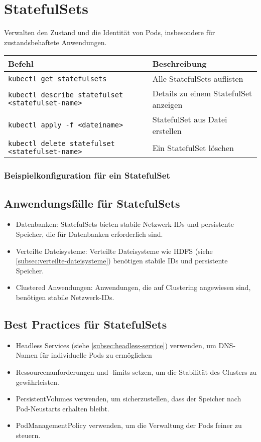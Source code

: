 \newpage
\section{StatefulSets}
\label{sec:statefulsets}
Verwalten den Zustand und die Identität von Pods, insbesondere für zustandsbehaftete Anwendungen. \\

\noindent
\begin{tabular}{
|l|l|}
\hline
\textbf{Befehl} & \textbf{Beschreibung} \\
\hline
\texttt{kubectl get statefulsets} & Alle StatefulSets auflisten \\
\texttt{kubectl describe statefulset <statefulset-name>} & Details zu einem StatefulSet anzeigen \\
\texttt{kubectl apply -f <dateiname>} & StatefulSet aus Datei erstellen\\
\texttt{kubectl delete statefulset <statefulset-name>} & Ein StatefulSet löschen \\
\hline
\end{tabular}

\subsubsection{Beispielkonfiguration für ein StatefulSet}


\newpage
\subsection{Anwendungsfälle für StatefulSets}
\begin{itemize}
    \item Datenbanken: StatefulSets bieten stabile Netzwerk-IDs und persistente Speicher, die für Datenbanken erforderlich sind.
    \item Verteilte Dateisysteme: Verteilte Dateisysteme wie HDFS (siehe \ref{subsec:verteilte-dateisysteme}) benötigen stabile IDs und persistente Speicher.
    \item Clustered Anwendungen: Anwendungen, die auf Clustering angewiesen sind, benötigen stabile Netzwerk-IDs.
\end{itemize}
\subsection{Best Practices für StatefulSets}
\begin{itemize}
    \item Headless Services (siehe \ref{subsec:headless-service}) verwenden, um DNS-Namen für individuelle Pods zu ermöglichen
    \item Ressourcenanforderungen und -limits setzen, um die Stabilität des Clusters zu gewährleisten.
    \item PersistentVolumes verwenden, um sicherzustellen, dass der Speicher nach Pod-Neustarts erhalten bleibt.
    \item PodManagementPolicy verwenden, um die Verwaltung der Pods feiner zu steuern.
\end{itemize}
